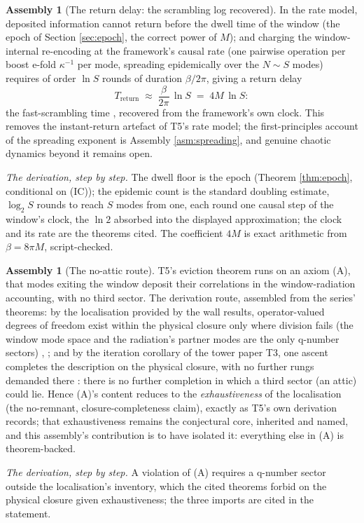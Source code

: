 \documentclass[11pt]{article}
\theoremstyle{definition}
\newtheorem{assembly}[theorem]{Assembly}
\begin{document}
\begin{assembly}[The return delay: the scrambling log recovered]\label{asm:delay}
In the rate model, deposited information cannot return before the dwell time of the window (the epoch of Section \ref{sec:epoch}, the correct power of $M$); and charging the window-internal re-encoding at the framework's causal rate (one pairwise operation per boost e-fold $\kappa^{-1}$ per mode, spreading epidemically over the $N \sim S$ modes) requires of order $\ln S$ rounds of duration $\beta/2\pi$, giving a return delay
\[
T_{\mathrm{return}} \;\approx\; \frac{\beta}{2\pi}\,\ln S \;=\; 4M\,\ln S :
\]
the fast-scrambling time \cite{HaydenPreskill2007, SekinoSusskind2008}, recovered from the framework's own clock. This removes the instant-return artefact of T5's rate model; the first-principles account of the spreading exponent is Assembly \ref{asm:spreading}, and genuine chaotic dynamics beyond it remains open.

\smallskip
\noindent\emph{The derivation, step by step.} The dwell floor is the epoch (Theorem \ref{thm:epoch}, conditional on (IC)); the epidemic count is the standard doubling estimate, $\log_2 S$ rounds to reach $S$ modes from one, each round one causal step of the window's clock, the $\ln 2$ absorbed into the displayed approximation; the clock and its rate are the theorems cited. The coefficient $4M$ is exact arithmetic from $\beta = 8\pi M$, script-checked.
\end{assembly}

\begin{assembly}[The no-attic route]\label{asm:noattic}
T5's eviction theorem runs on an axiom (A), that modes exiting the window deposit their correlations in the window-radiation accounting, with no third sector. The derivation route, assembled from the series' theorems: by the localisation provided by the wall results, operator-valued degrees of freedom exist within the physical closure only where division fails (the window mode space and the radiation's partner modes are the only q-number sectors) \cite[\S 5 and \S 8]{ButlerT4}, \cite[\S 10--11]{ButlerT5}; and by the iteration corollary of the tower paper T3, one ascent completes the description on the physical closure, with no further rungs demanded there \cite[Cor.~6.2]{ButlerT3}: there is no further completion in which a third sector (an attic) could lie. Hence (A)'s content reduces to the \emph{exhaustiveness} of the localisation (the no-remnant, closure-completeness claim), exactly as T5's own derivation records; that exhaustiveness remains the conjectural core, inherited and named, and this assembly's contribution is to have isolated it: everything else in (A) is theorem-backed.

\smallskip
\noindent\emph{The derivation, step by step.} A violation of (A) requires a q-number sector outside the localisation's inventory, which the cited theorems forbid on the physical closure given exhaustiveness; the three imports are cited in the statement.
\end{assembly}
\end{document}
